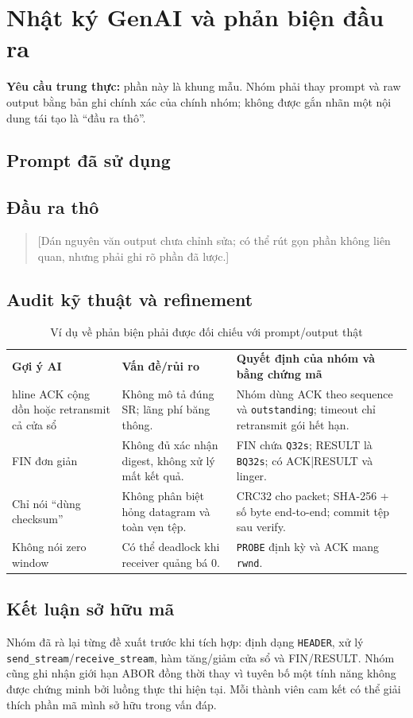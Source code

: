 \appendix
\section{Nhật ký GenAI và phản biện đầu ra}

\textbf{Yêu cầu trung thực:} phần này là khung mẫu. 
Nhóm phải thay prompt và raw output bằng bản ghi chính xác của chính nhóm; không được gắn nhãn một nội dung tái tạo là ``đầu ra thô''.

\subsection{Prompt đã sử dụng}
\begin{quote}\small{}
\end{quote}

\subsection{Đầu ra thô}
\begin{quote}\small
[Dán nguyên văn output chưa chỉnh sửa; có thể rút gọn phần không liên quan, nhưng phải ghi rõ phần đã lược.] 
\end{quote}

\subsection{Audit kỹ thuật và refinement}
\begin{table}[H]\centering\small
\begin{tabular}{|p{3.2cm}|p{4.2cm}|p{5.1cm}|}\hline
\textbf{Gợi ý AI}&\textbf{Vấn đề/rủi ro}&\textbf{Quyết định của nhóm và bằng chứng mã}\
\\hline
ACK cộng dồn hoặc retransmit cả cửa sổ&Không mô tả đúng SR; lãng phí băng thông.&Nhóm dùng ACK theo sequence và \texttt{outstanding}; timeout chỉ retransmit gói hết hạn.\\\hline
FIN đơn giản&Không đủ xác nhận digest, không xử lý mất kết quả.&FIN chứa \texttt{Q32s}; RESULT là \texttt{BQ32s}; có ACK|RESULT và linger.\\\hline
Chỉ nói ``dùng checksum''&Không phân biệt hỏng datagram và toàn vẹn tệp.&CRC32 cho packet; SHA-256 + số byte end-to-end; commit tệp sau verify.\\\hline
Không nói zero window&Có thể deadlock khi receiver quảng bá 0.&\texttt{PROBE} định kỳ và ACK mang \texttt{rwnd}.\\\hline
\end{tabular}\caption{Ví dụ về phản biện phải được đối chiếu với prompt/output thật}\end{table}

\subsection{Kết luận sở hữu mã}
Nhóm đã rà lại từng đề xuất trước khi tích hợp: định dạng \texttt{HEADER}, xử lý \texttt{send\_stream}/\texttt{receive\_stream}, hàm tăng/giảm cửa sổ và FIN/RESULT. 
Nhóm cũng ghi nhận giới hạn ABOR đồng thời thay vì tuyên bố một tính năng không được chứng minh bởi luồng thực thi hiện tại. 
Mỗi thành viên cam kết có thể giải thích phần mã mình sở hữu trong vấn đáp.

